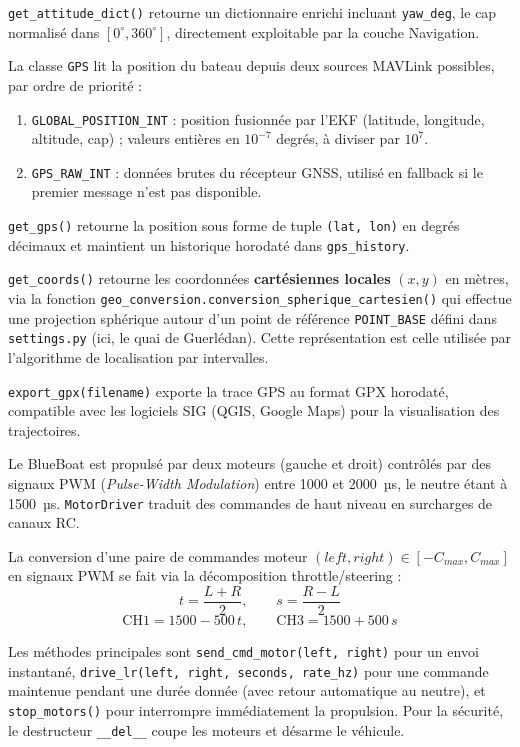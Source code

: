 \texttt{get\_attitude\_dict()} retourne un dictionnaire enrichi incluant \texttt{yaw\_deg}, le cap normalisé dans $[0^\circ, 360^\circ]$, directement exploitable par la couche Navigation.

La classe \texttt{GPS} lit la position du bateau depuis deux sources MAVLink possibles, par ordre de priorité :
\begin{enumerate}
  \item \texttt{GLOBAL\_POSITION\_INT} : position fusionnée par l'EKF (latitude, longitude, altitude, cap) ; valeurs entières en $10^{-7}$ degrés, à diviser par $10^7$.
  \item \texttt{GPS\_RAW\_INT} : données brutes du récepteur GNSS, utilisé en fallback si le premier message n'est pas disponible.
\end{enumerate}

\texttt{get\_gps()} retourne la position sous forme de tuple \texttt{(lat, lon)} en degrés décimaux et maintient un historique horodaté dans \texttt{gps\_history}.

\texttt{get\_coords()} retourne les coordonnées \textbf{cartésiennes locales} $(x, y)$ en mètres, via la fonction \texttt{geo\_conversion.conversion\_spherique\_cartesien()} qui effectue une projection sphérique autour d'un point de référence \texttt{POINT\_BASE} défini dans \texttt{settings.py} (ici, le quai de Guerlédan). Cette représentation est celle utilisée par l'algorithme de localisation par intervalles.

\texttt{export\_gpx(filename)} exporte la trace GPS au format GPX horodaté, compatible avec les logiciels SIG (QGIS, Google Maps) pour la visualisation des trajectoires.

Le BlueBoat est propulsé par deux moteurs (gauche et droit) contrôlés par des signaux PWM (\textit{Pulse-Width Modulation}) entre 1000 et 2000~µs, le neutre étant à 1500~µs. \texttt{MotorDriver} traduit des commandes de haut niveau en surcharges de canaux RC.

La conversion d'une paire de commandes moteur $(left, right) \in [-C_{max}, C_{max}]$ en signaux PWM se fait via la décomposition throttle/steering :
\[
  t = \frac{L + R}{2}, \qquad s = \frac{R - L}{2}
\]
\[
  \text{CH1} = 1500 - 500\,t, \qquad \text{CH3} = 1500 + 500\,s
\]

Les méthodes principales sont \texttt{send\_cmd\_motor(left, right)} pour un envoi instantané, \texttt{drive\_lr(left, right, seconds, rate\_hz)} pour une commande maintenue pendant une durée donnée (avec retour automatique au neutre), et \texttt{stop\_motors()} pour interrompre immédiatement la propulsion. Pour la sécurité, le destructeur \texttt{\_\_del\_\_} coupe les moteurs et désarme le véhicule.

